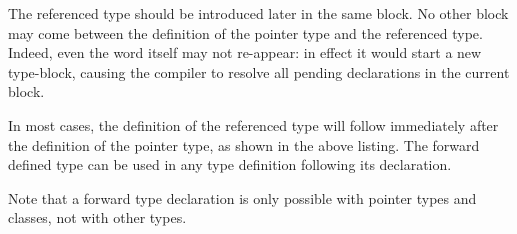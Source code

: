 The referenced type should be introduced later in the same  block. 
No other block may come between the definition of the pointer type and the referenced type.
Indeed, even the word  itself may not re-appear: in effect it
would start a new type-block, causing the compiler to resolve all pending
declarations in the current block. 

In most cases, the definition of the referenced type will follow immediately 
after the definition of the pointer type, as shown in the above listing. 
The forward defined type can be used in any type definition following its 
declaration.

Note that a forward type declaration is only possible with pointer types and
classes, not with other types.

